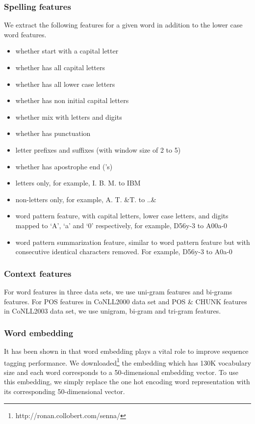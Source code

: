 \documentclass[11pt,a4paper]{article}
\begin{document}
\subsubsection{Spelling features}
We extract the following features for a given word in addition to the lower case word features.
\begin{itemize}[noitemsep,nolistsep]
\item whether start with a capital letter
\item whether has all capital letters
\item whether has all lower case letters
\item whether has non initial capital letters
\item whether mix with letters and digits 
\item whether has punctuation 
\item letter prefixes and suffixes (with window size of 2 to 5)
\item whether has apostrophe end ('s)
\item letters only, for example, I. B. M. to IBM
\item non-letters only, for example, A. T. \&T. to ..\&
\item word pattern feature, with capital letters, lower case letters, and digits mapped to `A', `a' and `0' respectively, for example, D56y-3 to A00a-0
\item word pattern summarization feature, similar to word pattern feature but with consecutive identical characters removed. For example, D56y-3 to A0a-0
\end{itemize}

\subsubsection{Context features}
For word features in three data sets, we use uni-gram features and bi-grams features. For POS features in CoNLL2000 data set and POS \& CHUNK features in CoNLL2003 data set, we use unigram, bi-gram and tri-gram features. 

\subsubsection{Word embedding} \label{sec:sennaEmbedding}
It has been shown in \cite{collobert1} that word embedding plays a vital role to improve sequence tagging performance. We downloaded\footnote{http://ronan.collobert.com/senna/} the embedding which has 130K vocabulary size and each word corresponds to a 50-dimensional embedding vector. To use this embedding, we simply replace the one hot encoding word representation with its corresponding 50-dimensional vector.
\end{document}
